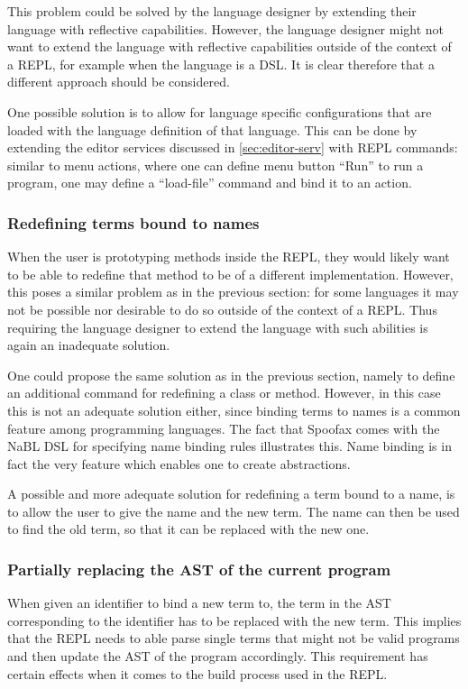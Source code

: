 This problem could be solved by the language designer by extending
their language with reflective capabilities. However, the language
designer might not want to extend the language with reflective
capabilities outside of the context of a REPL, for example when the
language is a DSL. It is clear therefore that a different approach
should be considered.

One possible solution is to allow for language specific configurations
that are loaded with the language definition of that language. This
can be done by extending the editor services discussed in
\cref{sec:editor-serv} with REPL commands: similar to menu actions,
where one can define menu button ``Run'' to run a program, one may
define a ``load-file'' command and bind it to an action.

\subsubsection{Redefining terms bound to names}
\label{sec:redef-cont-bound}
When the user is prototyping methods inside the REPL, they would
likely want to be able to redefine that method to be of a different
implementation. However, this poses a similar problem as in the
previous section: for some languages it may not be possible nor
desirable to do so outside of the context of a REPL. Thus requiring
the language designer to extend the language with such abilities is
again an inadequate solution.

One could propose the same solution as in the previous section, namely
to define an additional command for redefining a class or
method. However, in this case this is not an adequate solution either,
since binding terms to names is a common feature among programming
languages. The fact that Spoofax comes with the NaBL DSL for
specifying name binding rules illustrates this. Name binding is in
fact the very feature which enables one to create abstractions.

A possible and more adequate solution for redefining a term bound to a
name, is to allow the user to give the name and the new term. The name
can then be used to find the old term, so that it can be replaced with
the new one.

\subsubsection{Partially replacing the AST of the current program}
When given an identifier to bind a new term to, the term in the AST
corresponding to the identifier has to be replaced with the new term.
This implies that the REPL needs to able parse single terms that might
not be valid programs and then update the AST of the program accordingly.
This requirement has certain effects when it comes to the build process
used in the REPL.

